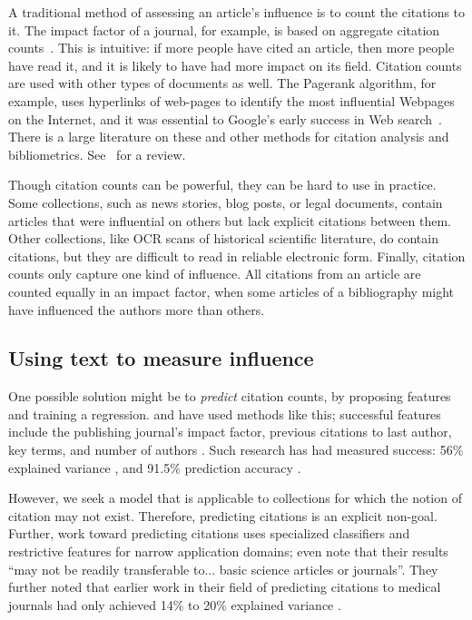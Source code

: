 A traditional method of assessing an article's influence is to count
the citations to it. The impact factor of a journal, for example, is
based on aggregate citation counts~\citep{garfield:2002}.  This is
intuitive: if more people have cited an article, then more people have
read it, and it is likely to have had more impact on its field.
Citation counts are used with other types of documents as well.  The
Pagerank algorithm, for example, uses hyperlinks of web-pages to
identify the most influential Webpages on the Internet, and it was
essential to Google's early success in Web search~\citep{brin:1998}.
There is a large literature on these and other methods for citation
analysis and bibliometrics.  See~\cite{osareh:1996} for a review.

Though citation counts can be powerful, they can be hard to use in
practice.  Some collections, such as news stories, blog posts, or
legal documents, contain articles that were influential on others but
lack explicit citations between them.  Other collections, like OCR
scans of historical scientific literature, do contain citations, but
they are difficult to read in reliable electronic form.  Finally,
citation counts only capture one kind of influence.  All citations
from an article are counted equally in an impact factor, when some
articles of a bibliography might have influenced the authors more than
others.

\subsection*{Using text to measure influence}

One possible solution might be to \emph{predict} citation counts, by
proposing features and training a regression. \cite{tang:2009} and
\cite{lokker:2008} have used methods like this; successful features include
the publishing journal's impact factor, previous citations to last
author, key terms, and number of authors
\citep{tang:2009,lokker:2008}.  Such research has had measured
success: 56\% explained variance \citep{lokker:2008}, and 91.5\%
prediction accuracy \citep{ibanez:2009}.

However, we seek a model that is applicable to collections for which
the notion of citation may not exist.  Therefore, predicting citations
is an explicit non-goal.  Further, work toward predicting citations
uses specialized classifiers and restrictive features for narrow
application domains; \cite{lokker:2008} even note that their results
``may not be readily transferable to... basic science articles or
journals''. They further noted that earlier work in their field of
predicting citations to medical journals had only achieved 14\% to
20\% explained variance \citep{lokker:2008}.

